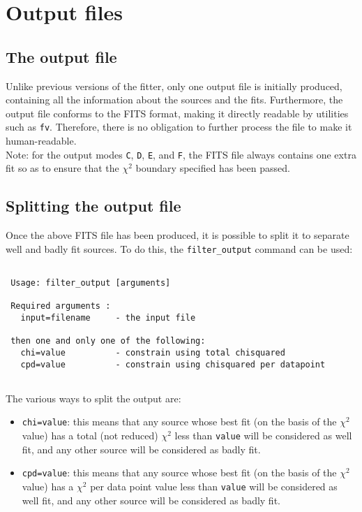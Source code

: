 \documentclass[letterpaper,11pt]{report}
\begin{document}
\chapter{Output files}

\section{The output file}

Unlike previous versions of the fitter, only one output file is initially produced, containing all the information about the sources and the fits. Furthermore, the output file conforms to the FITS format, making it directly readable by utilities such as \texttt{fv}. Therefore, there is no obligation to further process the file to make it human-readable.\\

Note: for the output modes \texttt{C}, \texttt{D}, \texttt{E}, and \texttt{F}, the FITS file always contains one extra fit so as to ensure that the $\chi^2$ boundary specified has been passed.

\section{Splitting the output file}

Once the above FITS file has been produced, it is possible to split it to separate well and badly fit sources. To do this, the \texttt{filter\_output} command can be used:\\

\begin{Verbatim}[frame=single,label=Syntax]

 Usage: filter_output [arguments]
 
 Required arguments :
   input=filename     - the input file
 
 then one and only one of the following:
   chi=value          - constrain using total chisquared
   cpd=value          - constrain using chisquared per datapoint
 
\end{Verbatim}

The various ways to split the output are:

\begin{itemize}
\item \texttt{chi=value}: this means that any source whose best fit (on the basis of the $\chi^2$ value) has a total (not reduced) $\chi^2$ less than \texttt{value} will be considered as well fit, and any other source will be considered as badly fit.
\item \texttt{cpd=value}:  this means that any source whose best fit (on the basis of the $\chi^2$ value) has a $\chi^2$ per data point value less than \texttt{value} will be considered as well fit, and any other source will be considered as badly fit.
\end{itemize}
\end{document}
